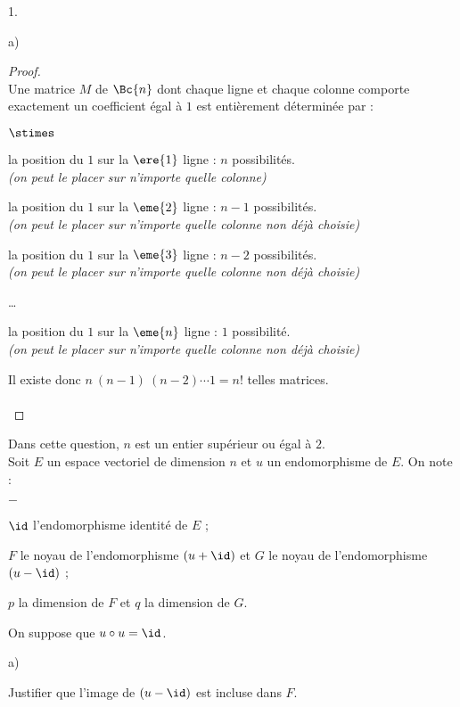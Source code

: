 \documentclass[11pt]{article}%
\begin{document}
\begin{noliste}{1.}
\begin{noliste}{a)}
    \begin{proof}~\\
      Une matrice $M$ de $\Bc{n}$ dont chaque ligne et chaque colonne
      comporte exactement un coefficient égal à $1$ est entièrement
      déterminée par :
      \begin{noliste}{$\stimes$}
      \item la position du $1$ sur la $\ere{1}$ ligne : $n$
        possibilités.\\
        {\it (on peut le placer sur n'importe quelle colonne)}
      \item la position du $1$ sur la $\eme{2}$ ligne : $n-1$
        possibilités.\\
        {\it (on peut le placer sur n'importe quelle colonne non déjà
          choisie)}
      \item la position du $1$ sur la $\eme{3}$ ligne : $n-2$
        possibilités.\\
        {\it (on peut le placer sur n'importe quelle colonne non déjà
          choisie)}
      \item \ldots
      \item la position du $1$ sur la $\eme{n}$ ligne : $1$
        possibilité.\\
        {\it (on peut le placer sur n'importe quelle colonne non déjà
          choisie)}
      \end{noliste}
      Il existe donc $n \ (n-1) \ (n-2) \cdots 1 = n!$ telles
      matrices.~\\[-.8cm]%
      ~\\[-1.4cm]
    \end{proof}
  \end{noliste}



  
\item Dans cette question, $n$ est un entier supérieur ou égal à $2$.\\
  Soit $E$ un espace vectoriel de dimension $n$ et $u$ un
  endomorphisme de $E$. On note :
  \begin{noliste}{$-$}
  \item $\id$ l'endomorphisme identité de $E$ ;
  \item $F$ le noyau de l'endomorphisme $(u+\id)$ et $G$ le noyau de
    l'endomorphisme $(u-\id)$ ;
  \item $p$ la dimension de $F$ et $q$ la dimension de $G$.
  \end{noliste}
  On suppose que $u \circ u =\id$.
  \begin{noliste}{a)}
    \setlength{\itemsep}{2mm}
  \item Justifier que l'image de $(u-\id)$ est incluse dans $F$.
	

\end{noliste}
\end{noliste}
\end{document}
